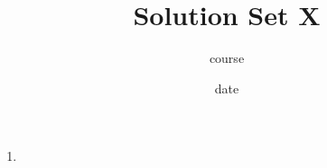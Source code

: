 




\title{Solution Set X}
\author[Daniel Gonzalez Cedre]{course}
\date{date}



\maketitle

\begin{enumerate}
    \item
\end{enumerate}



